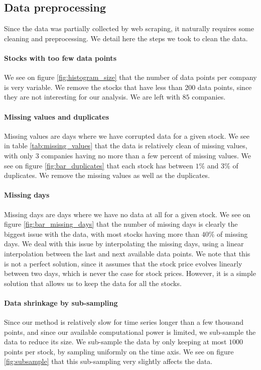 \documentclass[11pt]{article}
\begin{document}
\subsection{Data preprocessing}
Since the data was partially collected by web scraping, it naturally requires some cleaning and preprocessing. We detail here the steps we took to clean the data.
\paragraph*{Stocks with too few data points} We see on figure \ref{fig:histogram_size} that the number of data points per company is very variable. We remove the stocks that have less than $200$ data points, since they are not interesting for our analysis. We are left with $85$ companies.
\paragraph*{Missing values and duplicates} Missing values are days where we have corrupted data for a given stock. We see in table \ref{tab:missing_values} that the data is relatively clean of missing values, with only $3$ companies having no more than a few percent of missing values. We see on figure \ref{fig:bar_duplicates} that each stock has between $1\%$ and $3\%$ of duplicates. We remove the missing values as well as the duplicates.
\paragraph*{Missing days} Missing days are days where we have no data at all for a given stock. We see on figure \ref{fig:bar_missing_days} that the number of missing days is clearly the biggest issue with the data, with most stocks having more than $40\%$ of missing days. We deal with this issue by interpolating the missing days, using a linear interpolation between the last and next available data points. We note that this is not a perfect solution, since it assumes that the stock price evolves linearly between two days, which is never the case for stock prices. However, it is a simple solution that allows us to keep the data for all the stocks.
\paragraph*{Data shrinkage by sub-sampling} Since our method is relatively slow for time series longer than a few thousand points, and since our available computational power is limited, we sub-sample the data to reduce its size. We sub-sample the data by only keeping at most $1000$ points per stock, by sampling uniformly on the time axis. We see on figure \ref{fig:subsample} that this sub-sampling very slightly affects the data.
\end{document}
